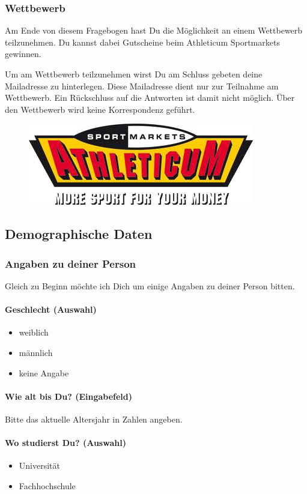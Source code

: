 \subsubsection{Wettbewerb}
Am Ende von diesem Fragebogen hast Du die Möglichkeit an einem Wettbewerb teilzunehmen. Du kannst dabei Gutscheine beim Athleticum Sportmarkets gewinnen. \par
Um am Wettbewerb teilzunehmen wirst Du am Schluss gebeten deine Mailadresse zu hinterlegen. Diese Mailadresse dient nur zur Teilnahme am Wettbewerb. Ein Rückschluss auf die Antworten ist damit nicht möglich. Über den Wettbewerb wird keine Korrespondenz geführt.
\begin{figure}[h]
     \centering
     \includegraphics[scale=0.6]{images/anhang/sponsoring_athleticum_mittel.jpg}
\end{figure}
\subsection{Demographische Daten}\label{anhangSesction.demograpData}
\subsubsection{Angaben zu deiner Person}
Gleich zu Beginn möchte ich Dich um einige Angaben zu deiner Person bitten.
\paragraph{Geschlecht (Auswahl)}
    \begin{itemize}
      \item weiblich
      \item männlich
      \item keine Angabe
    \end{itemize}

\paragraph{Wie alt bis Du? (Eingabefeld)}
Bitte das aktuelle Altersjahr in Zahlen angeben.
\paragraph{Wo studierst Du? (Auswahl)}
    \begin{itemize}
      \item Universität
      \item Fachhochschule
    \end{itemize}
